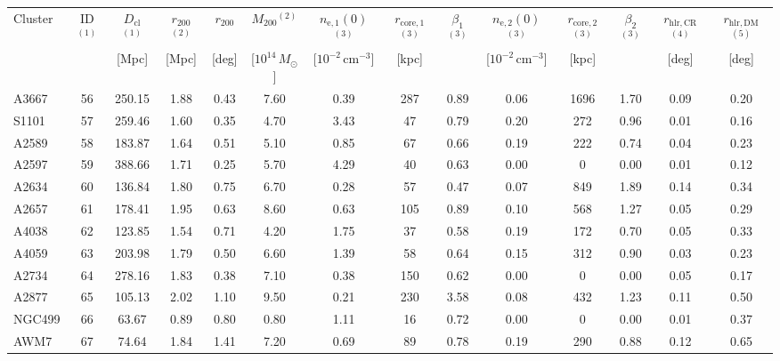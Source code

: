 \documentclass[10pt,aps,pra,reprint,amsmath,amsfonts,amssymb,showpacs,nofootinbib,floatfix]{revtex4-1}
\newcommand{\rmn}{\mathrm}
\newcommand{\clu}{\rmn{cl}}
\newcommand{\msun}{M_\odot}
\newcommand{\vst}{\vspace{-0.14mm}}
\newcommand{\rvir}{r_{200}}
\newcommand{\mvir}{M_{200}}
\begin{document}
\begin{table}
\begin{minipage}{2.0\columnwidth}
\begin{tabular}{l  c c c c c c c c c c c c c}
\hline
\hline
Cluster & ID$^{(1)}$ & $D_\clu$$^{(1)}$ & $\rvir$$^{(2)}$ & $\rvir$ & 
$\mvir$$^{(2)}$ & $n_\rmn{e,1}(0)$$^{(3)}$ & $r_\rmn{core,1}$$^{(3)}$ & 
$\beta_1$$^{(3)}$ & $n_\rmn{e,2}(0)$$^{(3)}$ & $r_\rmn{core,2}$$^{(3)}$ & 
$\beta_2$$^{(3)}$ & $r_\rmn{hlr,CR}$$^{(4)}$ & $r_\rmn{hlr,DM}$  $^{(5)}$ \\
& & [Mpc] & [Mpc] & [deg] & [$10^{14}\,\msun$] 
& [$10^{-2}\,\rmn{cm}^{-3}$] & [kpc] &  & 
  [$10^{-2}\,\rmn{cm}^{-3}$] & [kpc] &  & [deg] & [deg] \\
 \hline
A3667    &  56 & 250.15 &   1.88 &   0.43 &   7.60 &   0.39 & 287 &   0.89 &   0.06 & 1696 &   1.70 &   0.09 &   0.20 \vst \\
S1101    &  57 & 259.46 &   1.60 &   0.35 &   4.70 &   3.43 &  47 &   0.79 &   0.20 &  272 &   0.96 &   0.01 &   0.16 \vst \\
A2589    &  58 & 183.87 &   1.64 &   0.51 &   5.10 &   0.85 &  67 &   0.66 &   0.19 &  222 &   0.74 &   0.04 &   0.23 \vst \\
A2597    &  59 & 388.66 &   1.71 &   0.25 &   5.70 &   4.29 &  40 &   0.63 &   0.00 &    0 &   0.00 &   0.01 &   0.12 \vst \\
A2634    &  60 & 136.84 &   1.80 &   0.75 &   6.70 &   0.28 &  57 &   0.47 &   0.07 &  849 &   1.89 &   0.14 &   0.34 \vst \\
A2657    &  61 & 178.41 &   1.95 &   0.63 &   8.60 &   0.63 & 105 &   0.89 &   0.10 &  568 &   1.27 &   0.05 &   0.29 \vst \\
A4038    &  62 & 123.85 &   1.54 &   0.71 &   4.20 &   1.75 &  37 &   0.58 &   0.19 &  172 &   0.70 &   0.05 &   0.33 \vst \\
A4059    &  63 & 203.98 &   1.79 &   0.50 &   6.60 &   1.39 &  58 &   0.64 &   0.15 &  312 &   0.90 &   0.03 &   0.23 \vst \\
A2734    &  64 & 278.16 &   1.83 &   0.38 &   7.10 &   0.38 & 150 &   0.62 &   0.00 &    0 &   0.00 &   0.05 &   0.17 \vst \\
A2877    &  65 & 105.13 &   2.02 &   1.10 &   9.50 &   0.21 & 230 &   3.58 &   0.08 &  432 &   1.23 &   0.11 &   0.50 \vst \\
NGC499   &  66 &  63.67 &   0.89 &   0.80 &   0.80 &   1.11 &  16 &   0.72 &   0.00 &    0 &   0.00 &   0.01 &   0.37 \vst \\
AWM7     &  67 &  74.64 &   1.84 &   1.41 &   7.20 &   0.69 &  89 &   0.78 &   0.19 &  290 &   0.88 &   0.12 &   0.65 \vst \\

\end{tabular}
\end{minipage}
\end{table}
\end{document}
